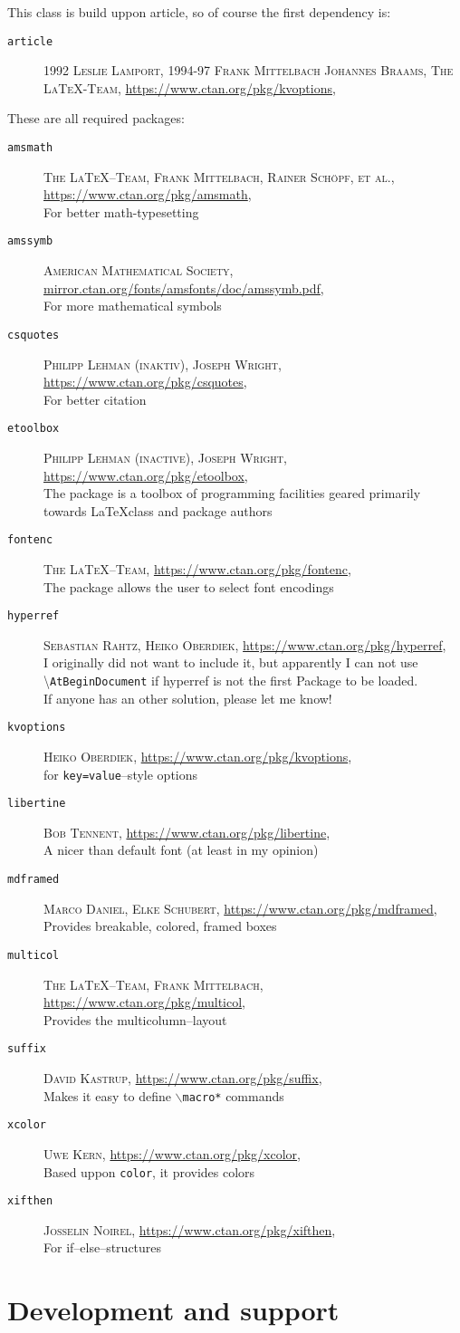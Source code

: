\documentclass[a4paper,landscape,columns=3]{cheatsheet}
\begin{document}
This class is build uppon \textrm{article}, so of course the first
dependency is:
\newcommand{\dep}[4]{\item[\texttt{#1}]\textsc{#2}, \url{#3},\\#4}{}
\begin{description}
\dep{article}{1992 Leslie Lamport, 1994-97 Frank Mittelbach
Johannes Braams, The \LaTeX-Team}{https://www.ctan.org/pkg/kvoptions}
\end{description}
These are all required packages:
\begin{description}
  \dep{amsmath}{The \LaTeX--Team, Frank Mittelbach, Rainer Sch\"opf, et
    al.}{https://www.ctan.org/pkg/amsmath}{For better math-typesetting}
  \dep{amssymb}{American Mathematical
    Society}{mirror.ctan.org/fonts/amsfonts/doc/amssymb.pdf}{For more
    mathematical symbols}
  \dep{csquotes}{Philipp Lehman (inaktiv), Joseph
    Wright}{https://www.ctan.org/pkg/csquotes}{For better citation}
  \dep{etoolbox}{Philipp Lehman (inactive), Joseph
    Wright}{https://www.ctan.org/pkg/etoolbox}{The package is a toolbox
    of programming facilities geared primarily towards \LaTeX class and
    package authors}
  \dep{fontenc}{The
    \LaTeX{}--Team}{https://www.ctan.org/pkg/fontenc}{The package
    allows the user to select font encodings}
  \dep{hyperref}{Sebastian Rahtz, Heiko
  Oberdiek}{https://www.ctan.org/pkg/hyperref}{I originally did not
    want to include it, but apparently I can not use
    \textbackslash\lstinline{AtBeginDocument} if hyperref is not the
    first Package to be loaded.\\
    If anyone has an other solution, please let me know!}
  \dep{kvoptions}{Heiko Oberdiek}{https://www.ctan.org/pkg/kvoptions}{for
    \texttt{key=value}--style options}
  \dep{libertine}{Bob Tennent}{https://www.ctan.org/pkg/libertine}{ A
    nicer than default font (at least in my opinion)}
  \dep{mdframed}{Marco Daniel, Elke
    Schubert}{https://www.ctan.org/pkg/mdframed}{Provides breakable,
    colored, framed boxes}
  \dep{multicol}{The \LaTeX--Team, Frank
    Mittelbach}{https://www.ctan.org/pkg/multicol}{Provides the
    multicolumn--layout}
  \dep{suffix}{David Kastrup}{https://www.ctan.org/pkg/suffix}{Makes
    it easy to define \texttt{$\backslash$macro*} commands}
  \dep{xcolor}{Uwe Kern}{https://www.ctan.org/pkg/xcolor}{Based uppon
    \lstinline{color}, it provides colors}
  \dep{xifthen}{Josselin Noirel}{https://www.ctan.org/pkg/xifthen}{For
    if--else--structures} 
\end{description}
\section{Development and support}
\end{document}
